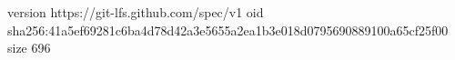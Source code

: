 version https://git-lfs.github.com/spec/v1
oid sha256:41a5ef69281c6ba4d78d42a3e5655a2ea1b3e018d0795690889100a65cf25f00
size 696
